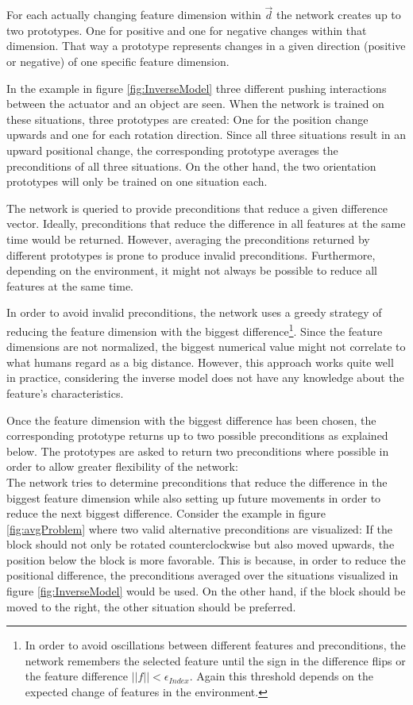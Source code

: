 For each actually changing feature dimension within $\vec{d}$ the network creates up to two prototypes. One for positive and one for negative changes within that dimension. That way a prototype represents changes in a given direction (positive or negative) of one specific feature dimension. 

In the example in figure \ref{fig:InverseModel} three different pushing interactions between the actuator and an object are seen. 
When the network is trained on these situations, three prototypes are created: One for the position change upwards and one for each rotation direction. 
Since all three situations result in an upward positional change, the corresponding prototype averages the preconditions of all three situations.
On the other hand, the two orientation prototypes will only be trained on one situation each.

The network is queried to provide preconditions that reduce a given difference vector. Ideally, preconditions that reduce the difference in all features at the same time would be returned. 
However, averaging the preconditions returned by different prototypes is prone to produce invalid preconditions. 
Furthermore, depending on the environment, it might not always be possible to reduce all features at the same time. 

In order to avoid invalid preconditions, the network uses a greedy strategy of reducing the feature dimension with the biggest difference\footnote{In order to avoid oscillations between different features and preconditions, the network remembers the selected feature until the sign in the difference flips or the feature difference $||f|| < \epsilon_{Index}$. Again this threshold depends on the expected change of features in the environment.}. Since the feature dimensions are not normalized, the biggest numerical value might not correlate to what humans regard as a big distance. 
However, this approach works quite well in practice, considering the inverse model does not have any knowledge about the feature's characteristics. 

Once the feature dimension with the biggest difference has been chosen, the corresponding prototype returns up to two possible preconditions as explained below.
The prototypes are asked to return two preconditions where possible in order to allow greater flexibility of the network: \\
The network tries to determine preconditions that reduce the difference in the biggest feature dimension while also setting up future movements in order to reduce the next biggest difference. Consider the example in figure \ref{fig:avgProblem} where two valid alternative preconditions are visualized: If the block should not only be rotated counterclockwise but also moved upwards, the position below the block is more favorable. This is because, in order to reduce the positional difference, the preconditions averaged over the situations visualized in figure \ref{fig:InverseModel} would be used. On the other hand, if the block should be moved to the right, the other situation should be preferred.

